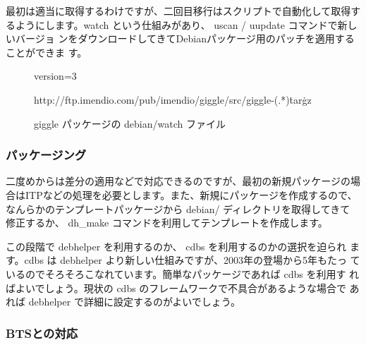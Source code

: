 \documentclass[mingoth,a4paper]{jsarticle}
\begin{document}
最初は適当に取得するわけですが、二回目移行はスクリプトで自動化して取得す
るようにします。watch という仕組みがあり、 uscan / uupdate コマンドで新しいバージョ
ンをダウンロードしてきてDebianパッケージ用のパッチを適用することができま
す。

\begin{figure}[h]
 \begin{commandline}
 version=3

 http://ftp.imendio.com/pub/imendio/giggle/src/giggle-(.*)\.tar\.gz

 \end{commandline}
\label{watchfile}
\caption{giggle パッケージの debian/watch ファイル}
\end{figure}


\subsubsection{パッケージング}

二度めからは差分の適用などで対応できるのですが、最初の新規パッケージの場
合はITPなどの処理を必要とします。また、新規にパッケージを作成するので、
なんらかのテンプレートパッケージから debian/ ディレクトリを取得してきて
修正するか、 dh\_make コマンドを利用してテンプレートを作成します。

この段階で debhelper を利用するのか、 cdbs を利用するのかの選択を迫られ
ます。cdbs は debhelper より新しい仕組みですが、2003年の登場から5年もたっ
ているのでそろそろこなれています。簡単なパッケージであれば cdbs を利用す
ればよいでしょう。現状の cdbs のフレームワークで不具合があるような場合で
あれば debhelper で詳細に設定するのがよいでしょう。


 \subsubsection{BTSとの対応}
\end{document}
